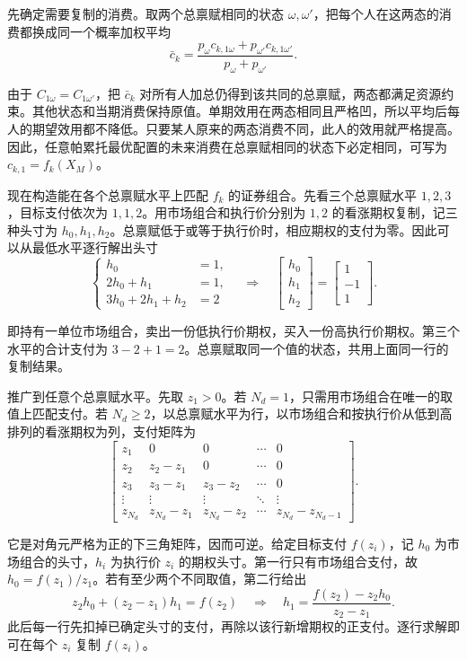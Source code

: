 \begin{solution}[label-content={证明},blank-type=none]
先确定需要复制的消费。取两个总禀赋相同的状态 $\omega,\omega'$，把每个人在这两态的消费都换成同一个概率加权平均
\[
 \bar c_k=
 \frac{p_\omega c_{k,1\omega}+p_{\omega'}c_{k,1\omega'}}
      {p_\omega+p_{\omega'}}.
\]

由于 $C_{1\omega}=C_{1\omega'}$，把 $\bar c_k$ 对所有人加总仍得到该共同的总禀赋，两态都满足资源约束。其他状态和当期消费保持原值。单期效用在两态相同且严格凹，所以平均后每人的期望效用都不降低。只要某人原来的两态消费不同，此人的效用就严格提高。因此，任意帕累托最优配置的未来消费在总禀赋相同的状态下必定相同，可写为 $c_{k,1}=f_k(X_M)$。

现在构造能在各个总禀赋水平上匹配 $f_k$ 的证券组合。先看三个总禀赋水平 $1,2,3$，目标支付依次为 $1,1,2$。用市场组合和执行价分别为 $1,2$ 的看涨期权复制，记三种头寸为 $h_0,h_1,h_2$。总禀赋低于或等于执行价时，相应期权的支付为零。因此可以从最低水平逐行解出头寸
\[
 \left\{
 \begin{aligned}
 h_0&=1,\\
 2h_0+h_1&=1,\\
 3h_0+2h_1+h_2&=2
 \end{aligned}
 \right.
 \quad\Longrightarrow\quad
 \begin{bmatrix}h_0\\h_1\\h_2\end{bmatrix}
 =\begin{bmatrix}1\\-1\\1\end{bmatrix}.
\]

即持有一单位市场组合，卖出一份低执行价期权，买入一份高执行价期权。第三个水平的合计支付为 $3-2+1=2$。总禀赋取同一个值的状态，共用上面同一行的复制结果。

推广到任意个总禀赋水平。先取 $z_1>0$。若 $N_d=1$，只需用市场组合在唯一的取值上匹配支付。若 $N_d\ge2$，以总禀赋水平为行，以市场组合和按执行价从低到高排列的看涨期权为列，支付矩阵为
\[
 \begin{bmatrix}
 z_1&0&0&\cdots&0\\
 z_2&z_2-z_1&0&\cdots&0\\
 z_3&z_3-z_1&z_3-z_2&\cdots&0\\
 \vdots&\vdots&\vdots&\ddots&\vdots\\
 z_{N_d}&z_{N_d}-z_1&z_{N_d}-z_2&\cdots&z_{N_d}-z_{N_d-1}
 \end{bmatrix}.
\]

它是对角元严格为正的下三角矩阵，因而可逆。给定目标支付 $f(z_i)$，记 $h_0$ 为市场组合的头寸，$h_i$ 为执行价 $z_i$ 的期权头寸。第一行只有市场组合支付，故 $h_0=f(z_1)/z_1$。若有至少两个不同取值，第二行给出
\[
 z_2h_0+(z_2-z_1)h_1=f(z_2)
 \quad\Longrightarrow\quad
 h_1=\frac{f(z_2)-z_2h_0}{z_2-z_1}.
\]
此后每一行先扣掉已确定头寸的支付，再除以该行新增期权的正支付。逐行求解即可在每个 $z_i$ 复制 $f(z_i)$。


\end{solution}
